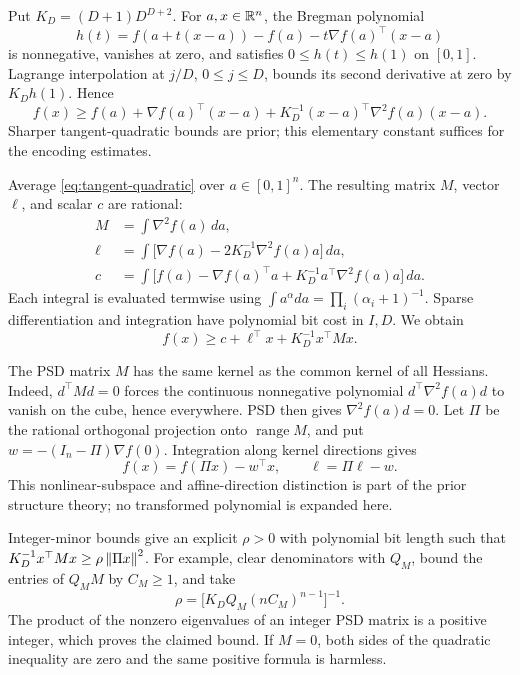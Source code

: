 Put $K_D=(D+1)D^{D+2}$. For $a,x\in\mathbb R^n$, the Bregman polynomial
\[
 h(t)=f(a+t(x-a))-f(a)-t\nabla f(a)^\top(x-a)
\]
is nonnegative, vanishes at zero, and satisfies $0\le h(t)\le h(1)$ on
$[0,1]$. Lagrange interpolation at $j/D$, $0\le j\le D$, bounds its
second derivative at zero by $K_Dh(1)$. Hence
\begin{equation}\label{eq:tangent-quadratic}
 f(x)\ge f(a)+\nabla f(a)^\top(x-a)
       +K_D^{-1}(x-a)^\top\nabla^2f(a)(x-a).
\end{equation}
Sharper tangent-quadratic bounds are prior; this elementary constant
suffices for the encoding estimates.

Average \eqref{eq:tangent-quadratic} over $a\in[0,1]^n$. The resulting
matrix $M$, vector $\ell$, and scalar $c$ are rational:
\begin{align*}
 M&=\int\nabla^2f(a)\,da,\\
 \ell&=\int\bigl[\nabla f(a)-2K_D^{-1}\nabla^2f(a)a\bigr]\,da,\\
 c&=\int\bigl[f(a)-\nabla f(a)^\top a+
                     K_D^{-1}a^\top\nabla^2f(a)a\bigr]\,da.
\end{align*}
Each integral is evaluated termwise using
$\int a^\alpha da=\prod_i(\alpha_i+1)^{-1}$. Sparse differentiation and
integration have polynomial bit cost in $I,D$. We obtain
\begin{equation}\label{eq:average-lower}
 f(x)\ge c+\ell^\top x+K_D^{-1}x^\top Mx.
\end{equation}

The PSD matrix $M$ has the same kernel as the common kernel of all
Hessians. Indeed, $d^\top Md=0$ forces the continuous nonnegative
polynomial $d^\top\nabla^2f(a)d$ to vanish on the cube, hence everywhere.
PSD then gives $\nabla^2f(a)d=0$. Let $\Pi$ be the rational orthogonal
projection onto $\operatorname{range}M$, and put
$w=-(I_n-\Pi)\nabla f(0)$. Integration along kernel directions gives
\begin{equation}\label{eq:invariance-slope}
 f(x)=f(\Pi x)-w^\top x,\qquad \ell=\Pi\ell-w.
\end{equation}
This nonlinear-subspace and affine-direction distinction is part of the
prior structure theory; no transformed polynomial is expanded here.

Integer-minor bounds give an explicit $\rho>0$ with polynomial bit length
such that $K_D^{-1}x^\top Mx\ge\rho\left\lVert\Pi x\right\rVert^2$. For example, clear
denominators with $Q_M$, bound the entries of $Q_MM$ by $C_M\ge1$, and
take
\[
 \rho=\bigl[K_DQ_M(nC_M)^{n-1}\bigr]^{-1}.
\]
The product of the nonzero eigenvalues of an integer PSD matrix is a
positive integer, which proves the claimed bound. If $M=0$, both sides of
the quadratic inequality are zero and the same positive formula is harmless.

